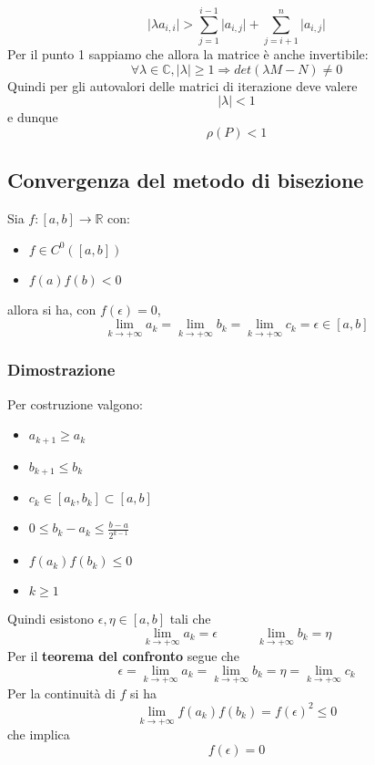 \begin{enumerate}
\begin{equation*}
		\lvert \lambda a_{i,i} \rvert >\sum_{j=1}^{i-1} \lvert a_{i,j} \rvert + \sum_{j=i+1}^{n} \lvert a_{i,j} \rvert 
	\end{equation*}
	Per il punto 1 sappiamo che allora la matrice è anche invertibile:
	\begin{equation*}
		\forall \lambda \in \mathbb{C}, \lvert \lambda \rvert \geq 1 \Longrightarrow det(\lambda M - N) \neq 0
	\end{equation*}
	Quindi per gli autovalori delle matrici di iterazione deve valere 
	\begin{equation*}
		\lvert \lambda \rvert < 1
	\end{equation*}
	e dunque
	\begin{equation*}
		\rho(P) < 1
	\end{equation*}
\end{enumerate}

\subsection{Convergenza del metodo di bisezione}
\begin{theorem}
	Sia $f:[a,b] \to \mathbb{R}$ con:
	\begin{itemize}
		\item $f \in C^0([a,b])$
		\item $f(a)f(b) <0$
	\end{itemize}
	allora si ha, con $f(\epsilon)=0$,
	\begin{equation}
		\lim_{k \to +\infty}a_k = \lim_{k \to +\infty} b_k = \lim_{k \to +\infty} c_k = \epsilon \in [a,b]
	\end{equation}
\end{theorem}
\subsubsection{Dimostrazione}
Per costruzione valgono:
\begin{itemize}
	\item $a_{k+1} \geq a_k$
	\item $b_{k+1} \leq b_k$
	\item $c_k \in [a_k,b_k] \subset [a,b]$
	\item $0 \leq b_k - a_k \leq \frac{b-a}{2^{k-1}}$
	\item $f(a_k)f(b_k) \leq 0$
	\item $k \geq 1$
\end{itemize}
Quindi esistono $\epsilon, \eta \in [a,b]$ tali che
\begin{equation*}
	\lim_{k \to +\infty} a_k = \epsilon \quad\quad\quad \lim_{k \to +\infty}b_k = \eta
\end{equation*}
Per il \textbf{teorema del confronto} segue che
\begin{equation*}
	\epsilon = \lim_{k \to +\infty}a_k = \lim_{k \to +\infty} b_k = \eta = \lim_{k \to +\infty} c_k
\end{equation*}
Per la continuità di $f$ si ha
\begin{equation*}
	\lim_{k \to +\infty} f(a_k)f(b_k) = f(\epsilon)^2 \leq 0
\end{equation*}
che implica
\begin{equation*}
	f(\epsilon)=0
\end{equation*}
